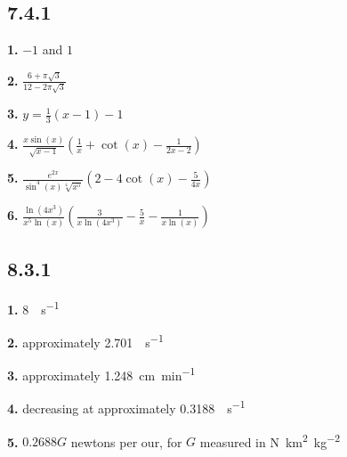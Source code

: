 \documentclass[12pt,]{book}
\theoremstyle{plain}
\theoremstyle{definition}
\numberwithin{equation}{section}
\newcommand{\fe}[2]{#1\mathopen{}\left(#2\right)\mathclose{}}
\begin{document}
                \par\smallskip
\subsection*{7.4.1 }
\noindent\textbf{1.}\quad{}
                \(-1\) and \(1\)%

            \par\smallskip
\noindent\textbf{2.}\quad{}
                \(\frac{6+\pi\sqrt{3}}{12-2\pi\sqrt{3}}\)%

            \par\smallskip
\noindent\textbf{3.}\quad{}
               \(y=\frac{1}{3}(x-1)-1\)%

            \par\smallskip
\noindent\textbf{4.}\quad{}
                    \(\frac{x\fe{\sin}{x}}{\sqrt{x-1}}\left(\frac{1}{x}+\fe{\cot}{x}-\frac{1}{2x-2}\right)\)%

                \par\smallskip
\noindent\textbf{5.}\quad{}
                    \(\frac{e^{2x}}{\fe{\sin^4}{x}\sqrt[4]{x^5}}\left(2-4\fe{\cot}{x}-\frac{5}{4x}\right)\)%

                \par\smallskip
\noindent\textbf{6.}\quad{}
                    \(\frac{\fe{\ln}{4x^3}}{x^5\fe{\ln}{x}}\left(\frac{3}{x\fe{\ln}{4x^3}}-\frac{5}{x}-\frac{1}{x\fe{\ln}{x}}\right)\)%

                \par\smallskip
\subsection*{8.3.1 }
\noindent\textbf{1.}\quad{}
                \SI{8}{\foot\per\second}%

            \par\smallskip
\noindent\textbf{2.}\quad{}
                approximately \SI{2.701}{\foot\per\second}%

            \par\smallskip
\noindent\textbf{3.}\quad{}
                approximately \SI{1.248}{\centi\meter\per\minute}%

            \par\smallskip
\noindent\textbf{4.}\quad{}
                decreasing at approximately \SI{0.3188}{\foot\per\second}%

            \par\smallskip
\noindent\textbf{5.}\quad{}
                \(0.2688G\) newtons per our, for \(G\) measured in \si{\newton\kilo\meter\tothe{2}\per\kilo\gram\tothe{2}}%
\end{document}
